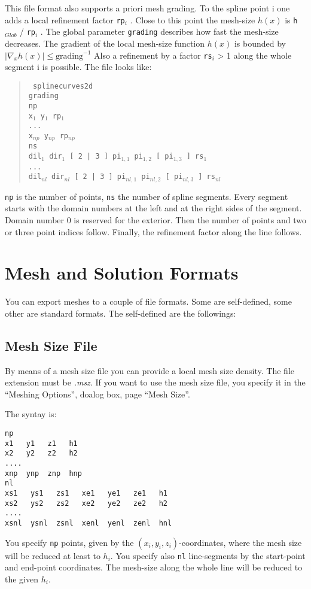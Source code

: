\documentclass[12pt]{book}
\begin{document}
This file format also supports a priori mesh grading. To the spline 
point i one adds a local refinement factor {\tt rp}$_i$ . Close to 
this point the mesh-size $h(x)$ is {\tt h}$_{Glob}$ / {\tt rp}$_i$ .
The global parameter {\tt grading} describes how fast the mesh-size decreases.
The gradient of the local mesh-size function $h(x)$ is bounded by
$| \nabla_x h(x)| \leq \mbox{grading}^{-1}$ 
Also a refinement by a factor {\tt rs}$_i$ > 1 along the whole 
segment i is possible.
The file looks like:
%
\begin{quote}
\samepage
\tt 
splinecurves2d   \\
grading   \\
np   \\
x$_1$ y$_1$ rp$_1$ \\
...   \\
x$_{np}$ y$_{np}$ rp$_{np}$ \\
ns   \\
dil$_1$ dir$_1$ [ 2 | 3 ] pi$_{1,1}$ pi$_{1,2}$ [ pi$_{1,3}$ ] rs$_1$ \\
... \\
dil$_{nl}$ dir$_{nl}$ [ 2 | 3 ] pi$_{nl,1}$ pi$_{nl,2}$ [ pi$_{nl,3}$ ] rs$_{nl}$ \\
\end{quote}
%
{\tt np} is the number of points, {\tt ns} the number of spline segments.
Every segment starts with the domain numbers at the left and at the
right sides of the segment. Domain number 0 is reserved for the exterior.  
Then the number of points and two or three point indices follow.
Finally, the refinement factor along the line follows.


\chapter{Mesh and Solution Formats}

You can export meshes to a couple of file formats. Some are self-defined,
some other are standard formats. The self-defined are the followings:

\section{Mesh Size File}
By means of a mesh size file you can provide a local mesh size density. The file extension must be {\it .msz}. If you want to use the mesh size file, you specify it in the ``Meshing Options'', doalog box, page ``Mesh Size''.

The syntay is:
\begin{verbatim}
np
x1   y1   z1   h1
x2   y2   z2   h2
....
xnp  ynp  znp  hnp
nl
xs1   ys1   zs1   xe1   ye1   ze1   h1
xs2   ys2   zs2   xe2   ye2   ze2   h2
....
xsnl  ysnl  zsnl  xenl  yenl  zenl  hnl
\end{verbatim}
You specify {\tt np} points, given by the $(x_i,y_i,z_i)$-coordinates,
where the mesh size will be reduced at least to $h_i$. You specify
also {\tt nl} line-segments by the start-point and end-point
coordinates. The mesh-size along the whole line will be reduced to the given $h_i$.
\end{document}
